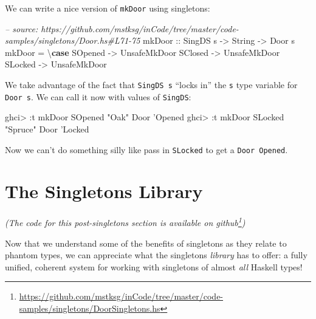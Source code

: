 \documentclass[]{article}
\newenvironment{Shaded}{}{}
\newcommand{\KeywordTok}[1]{\textcolor[rgb]{0.00,0.44,0.13}{\textbf{#1}}}
\newcommand{\DataTypeTok}[1]{\textcolor[rgb]{0.56,0.13,0.00}{#1}}
\newcommand{\CharTok}[1]{\textcolor[rgb]{0.25,0.44,0.63}{#1}}
\newcommand{\StringTok}[1]{\textcolor[rgb]{0.25,0.44,0.63}{#1}}
\newcommand{\CommentTok}[1]{\textcolor[rgb]{0.38,0.63,0.69}{\textit{#1}}}
\newcommand{\OtherTok}[1]{\textcolor[rgb]{0.00,0.44,0.13}{#1}}
\newcommand{\FunctionTok}[1]{\textcolor[rgb]{0.02,0.16,0.49}{#1}}
\newcommand{\NormalTok}[1]{#1}
\renewcommand{\href}[2]{#2\footnote{\url{#1}}}
\begin{document}
We can write a nice version of \texttt{mkDoor} using singletons:

\begin{Shaded}
\begin{Highlighting}[]
\CommentTok{-- source: https://github.com/mstksg/inCode/tree/master/code-samples/singletons/Door.hs#L71-75}
\OtherTok{mkDoor ::} \DataTypeTok{SingDS}\NormalTok{ s }\OtherTok{->} \DataTypeTok{String} \OtherTok{->} \DataTypeTok{Door}\NormalTok{ s}
\NormalTok{mkDoor }\FunctionTok{=}\NormalTok{ \textbackslash{}}\KeywordTok{case}
    \DataTypeTok{SOpened} \OtherTok{->} \DataTypeTok{UnsafeMkDoor}
    \DataTypeTok{SClosed} \OtherTok{->} \DataTypeTok{UnsafeMkDoor}
    \DataTypeTok{SLocked} \OtherTok{->} \DataTypeTok{UnsafeMkDoor}
\end{Highlighting}
\end{Shaded}

We take advantage of the fact that \texttt{SingDS\ s} ``locks in'' the
\texttt{s} type variable for \texttt{Door\ s}. We can call it now with values of
\texttt{SingDS}:

\begin{Shaded}
\begin{Highlighting}[]
\NormalTok{ghci}\FunctionTok{>} \FunctionTok{:}\NormalTok{t mkDoor }\DataTypeTok{SOpened} \StringTok{"Oak"}
\DataTypeTok{Door} \CharTok{'Opened}
\NormalTok{ghci}\FunctionTok{>} \FunctionTok{:}\NormalTok{t mkDoor }\DataTypeTok{SLocked} \StringTok{"Spruce"}
\DataTypeTok{Door} \CharTok{'Locked}
\end{Highlighting}
\end{Shaded}

Now we can't do something silly like pass in \texttt{SLocked} to get a
\texttt{Door\ \textquotesingle{}Opened}.

\section{The Singletons Library}\label{the-singletons-library}

\emph{(The code for this post-singletons section is available
\href{https://github.com/mstksg/inCode/tree/master/code-samples/singletons/DoorSingletons.hs}{on
github})}

Now that we understand some of the benefits of singletons as they relate to
phantom types, we can appreciate what the singletons \emph{library} has to
offer: a fully unified, coherent system for working with singletons of almost
\emph{all} Haskell types!
\end{document}
